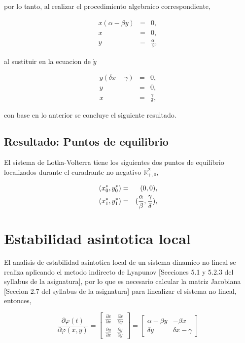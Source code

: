 \documentclass[letterpaper,11pt]{article}
\begin{document}
por lo tanto, al realizar el procedimiento algebraico correspondiente,

\begin{eqnarray*}
x(\alpha -\beta y) &=&0, \\
x &=&0, \\
y &=&\frac{\alpha }{\beta },
\end{eqnarray*}

al sustituir en la ecuacion de $\dot{y}$

\begin{eqnarray*}
y(\delta x-\gamma ) &=&0, \\
y &=&0, \\
x &=&\frac{\gamma }{\delta },
\end{eqnarray*}

con base en lo anterior se concluye el siguiente resultado.

\bigskip

\subsection{Resultado: Puntos de equilibrio}

\bigskip El sistema de Lotka-Volterra tiene los siguientes dos puntos de
equilibrio localizados durante el curadrante no negativo $%
\mathbb{R}
_{+,0}^{2}$,

\begin{eqnarray*}
(x_{0}^{\ast },y_{0}^{\ast }) &=&(0,0), \\
(x_{1}^{\ast },y_{1}^{\ast }) &=&(\frac{\alpha }{\beta },\frac{\gamma }{%
\delta }),
\end{eqnarray*}

\bigskip

\section{Estabilidad asintotica local}

El analisis de estabilidad asintotica local de un sistema dinamico no lineal
se realiza aplicando el metodo indirecto de Lyapunov [Secciones 5.1 y 5.2.3
del syllabus de la asignatura], por lo que es necesario calcular la matriz
Jacobiana [Seccion 2.7 del syllabus de la asignatura] para linealizar el
sistema no lineal, entonces,

\begin{equation*}
\frac{\partial \varphi (t)}{\partial \varphi (x,y)}=\left[ 
\begin{array}{cc}
\frac{\partial \dot{x}}{\partial x} & \frac{\partial \dot{x}}{\partial y} \\ 
\frac{\partial \dot{y}}{\partial x} & \frac{\partial \dot{y}}{\partial y}%
\end{array}%
\right] =\left[ 
\begin{array}{cc}
\alpha -\beta y & -\beta x \\ 
\delta y & \delta x-\gamma%
\end{array}%
\right]
\end{equation*}
\end{document}
